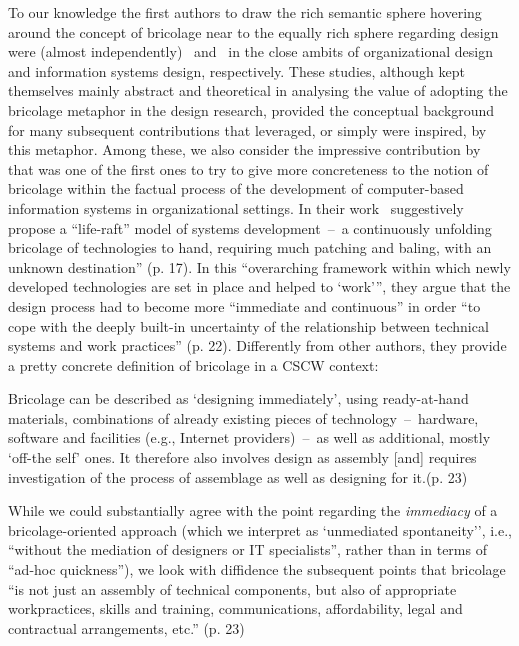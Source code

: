 \documentclass{article}
\let\origquotation\quotation
\let\endorigquotation\endquotation
\renewenvironment{quotation}{\vspace{-0.5\parskip}
  \origquotation
  \footnotesize
}{\endorigquotation}
\begin{document}
To our knowledge the first authors to draw the rich semantic sphere hovering around the concept of bricolage near to the equally rich sphere regarding design were (almost independently)~\citet{weick_organizational_1993} and~\citet{ciborra_thinking_1992} in the close ambits of organizational design and information systems design, respectively. These studies, although kept themselves mainly abstract and theoretical in analysing the value of adopting the bricolage metaphor in the design research,  provided the conceptual background for many subsequent contributions that leveraged, or simply were inspired, by this metaphor. Among these, we 
also consider the impressive contribution by~\citet{buescher_landscapes_2001} that was one of the first ones to try to give more concreteness to the notion of bricolage within the factual process of the development of computer-based information systems in organizational settings. In their work~\citet{buescher_landscapes_2001} suggestively propose a ``life-raft'' model of systems development~--~a continuously unfolding bricolage of technologies to hand, requiring much patching and baling, with an unknown destination'' (p. 17). In this ``overarching framework within which newly developed technologies are set in place and helped to `work''', they argue that the design process had to become more ``immediate and continuous'' in order ``to cope with the deeply built-in uncertainty of the relationship between technical systems and work practices'' (p. 22). Differently from other authors, they provide a pretty concrete definition of bricolage in a CSCW context:

\begin{quotation}
Bricolage can be described as `designing immediately', using ready-at-hand materials, combinations of already existing pieces of technology~--~hardware, software and facilities (e.g., Internet providers)~--~as well as additional, mostly `off-the self' ones. It therefore also involves design as assembly [and] requires investigation of the process of assemblage as well as designing for it.(p. 23)
\end{quotation} 

While we could substantially agree with the point regarding the \emph{immediacy} of a bricolage-oriented approach (which we interpret as `unmediated spontaneity'', i.e., ``without the mediation of designers or IT specialists'', rather than in terms of ``ad-hoc quickness''), we look with diffidence the subsequent points that bricolage ``is not just an assembly of technical components, but also of appropriate workpractices, skills and training, communications, affordability, legal and contractual arrangements, etc.'' (p. 23)
\end{document}
